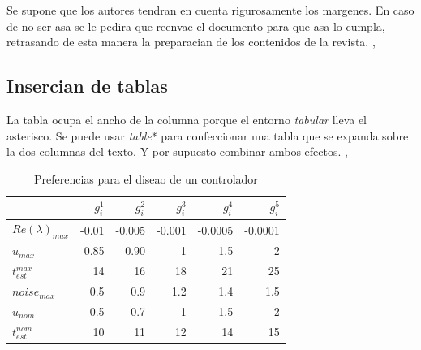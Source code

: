 \documentclass[5p,times,authoryear]{elsarticle}
\begin{document}
Se supone que los autores tendran en cuenta rigurosamente los margenes. En caso de no ser asa se le pedira que reenvae el documento para que asa lo cumpla, retrasando de esta manera la preparacian de los contenidos de la revista. \citep{Bak:63a}, \citep{Bak:63b}

\subsection{Insercian de tablas}

La tabla ocupa el ancho de la columna porque el entorno \emph{tabular} lleva el asterisco. Se puede usar \emph{table}* para confeccionar una tabla que se expanda sobre la dos columnas del texto. Y por supuesto combinar ambos efectos. \citep{Heritage:92}, \citep{ChaRou:66}


\begin{table}[htbp]
  \caption{Preferencias para el diseao de un controlador}
   \label{extremos45}
  \begin{tabular*}{\hsize}{lrrrrr}
\hline
    & $g_i^1$ & $g_i^2$ & $g_i^3$ & $g_i^4$ & $g_i^5$ \\
    \hline
$Re(\lambda)_{max}$ & -0.01  & -0.005 & -0.001 & -0.0005 & -0.0001 \\
$u_{max}$& 0.85 & 0.90 & 1 & 1.5 & 2  \\
$t_{est}^{max}$& 14 & 16 & 18 & 21 & 25 \\
$noise_{max}$& 0.5 & 0.9 & 1.2 & 1.4 & 1.5  \\
$u_{nom}$& 0.5 & 0.7 & 1  & 1.5 & 2  \\
$t_{est}^{nom}$& 10 & 11 & 12 & 14 & 15 \\
\hline
  \end{tabular*}
\end{table}
\end{document}
